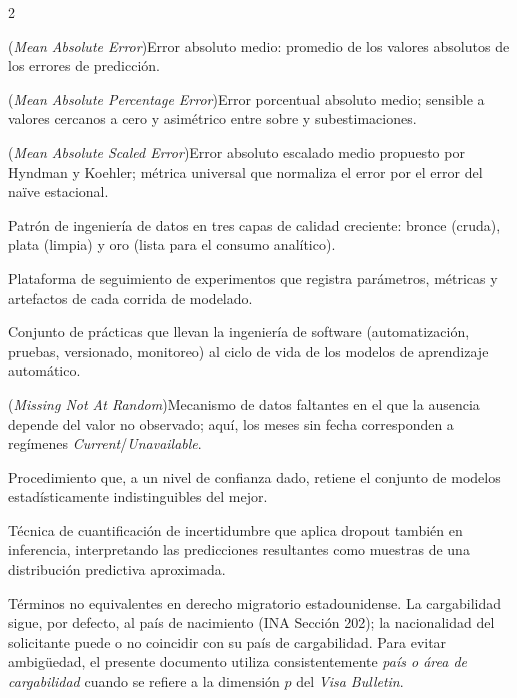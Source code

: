 \documentclass[12pt,letterpaper]{report}
\begin{document}
\begin{multicols}{2}
\begin{description}[leftmargin=0pt, labelindent=0pt, itemindent=0pt,
                    labelsep=0.4em, font=\bfseries\scriptsize,
                    itemsep=2pt, parsep=0pt, topsep=0pt]
    \item[MAE] (\textit{Mean Absolute Error})\hspace{0.3em}Error absoluto medio: promedio de los valores absolutos de los errores de predicción.

    \item[MAPE] (\textit{Mean Absolute Percentage Error})\hspace{0.3em}Error porcentual absoluto medio; sensible a valores cercanos a cero y asimétrico entre sobre y subestimaciones.

    \item[MASE] (\textit{Mean Absolute Scaled Error})\hspace{0.3em}Error absoluto escalado medio propuesto por Hyndman y Koehler; métrica universal que normaliza el error por el error del naïve estacional.

    \item[Medallón (arquitectura)] Patrón de ingeniería de datos en tres capas de calidad creciente: bronce (cruda), plata (limpia) y oro (lista para el consumo analítico).

    \item[MLflow] Plataforma de seguimiento de experimentos que registra parámetros, métricas y artefactos de cada corrida de modelado.

    \item[MLOps] Conjunto de prácticas que llevan la ingeniería de software (automatización, pruebas, versionado, monitoreo) al ciclo de vida de los modelos de aprendizaje automático.

    \item[MNAR] (\textit{Missing Not At Random})\hspace{0.3em}Mecanismo de datos faltantes en el que la ausencia depende del valor no observado; aquí, los meses sin fecha corresponden a regímenes \textit{Current}/\textit{Unavailable}.

    \item[Model Confidence Set (MCS)] Procedimiento que, a un nivel de confianza dado, retiene el conjunto de modelos estadísticamente indistinguibles del mejor.

    \item[Monte Carlo Dropout] Técnica de cuantificación de incertidumbre que aplica dropout también en inferencia, interpretando las predicciones resultantes como muestras de una distribución predictiva aproximada.

    \item[Nacionalidad vs. país de cargabilidad] Términos no equivalentes en derecho migratorio estadounidense. La cargabilidad sigue, por defecto, al país de nacimiento (INA Sección 202); la nacionalidad del solicitante puede o no coincidir con su país de cargabilidad. Para evitar ambigüedad, el presente documento utiliza consistentemente \textit{país o área de cargabilidad} cuando se refiere a la dimensión $p$ del \textit{Visa Bulletin}.


\end{description}
\end{multicols}
\end{document}
